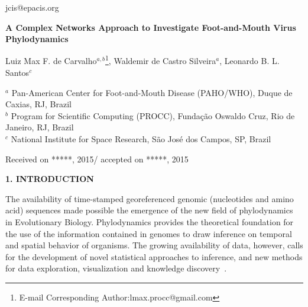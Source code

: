 \documentclass[12pt]{article}
\begin{document}
\linenumbers
{\footnotesize jcis@epacis.org}

\begin{center}

{\bf A Complex Networks Approach to Investigate Foot-and-Mouth Virus Phylodynamics}
\bigskip


{\small Luiz Max F. de Carvalho$^{a,b}$\footnote{E-mail Corresponding Author:lmax.procc@gmail.com},  Waldemir de Castro Silveira$^a$, Leonardo B. L. Santos$^{c}$
}
\smallskip

{\small
$^a$ Pan-American Center for Foot-and-Mouth Disease (PAHO/WHO), Duque de Caxias, RJ, Brazil\\
$^b$ Program for Scientific Computing (PROCC), Funda\c{c}\~ao Oswaldo Cruz, Rio de Janeiro, RJ, Brazil\\
$^c$ National Institute for Space Research, S\~ao Jos\'e dos Campos, SP, Brazil\\
}


{\footnotesize Received on *****, 2015/ accepted on *****, 2015}

\end{center}



\begin{abstract}
In this article we propose a network-based approach to the analysis and visualization of viral molecular data, which incorporates ecological and epidemiological information.
Foot-and-Mouth Disease virus (FMDV) is a highly mutant virus that affects cloven-hoofed livestock and a major animal health problem.
We use the methodology developed herein to analyze 167 VP1 (1D) serotype O FMDV gene sequences from South America.
Our data spans over eight countries, covering 16 years of FMDV circulation in the continent. 
\bigskip

{\footnotesize
{\bf Keywords}: Computational Biology and Bioinformatics, Complex Networks, Community Detection, Phylodynamics, Foot-and-Mouth Disease Virus}
\end{abstract}

\textbf{1. INTRODUCTION}

\bigskip
\bigskip

 

The availability of time-stamped georeferenced genomic (nucleotides and amino acid) sequences made possible the emergence of the  new field of phylodynamics~\cite{grenfell,MEP} in Evolutionary Biology.
Phylodynamics provides the theoretical foundation for the use of the information contained in genomes to draw inference on temporal and spatial behavior of organisms.
The growing availability of  data, however, calls for the development of novel statistical approaches to inference, and new methods for data exploration, visualization and knowledge discovery~\cite{putting,cancer,PRE,Gavin2004,Pirovani}.
\end{document}
